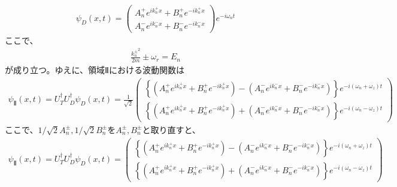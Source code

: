 \begin{align}
{\psi}_{D}(x,t) =
\begin{pmatrix}
A_{n}^{+}e^{ik_{n}^{+}x}+B_{n}^{+}e^{-ik_{n}^{+}x}  \\
A_{n}^{-}e^{ik_{n}^{-}x}+B_{n}^{-}e^{-ik_{n}^{-}x}
\end{pmatrix}
e^{-i\omega_{n}t}
\end{align}
ここで、
\begin{align}
\frac{{k_{n}^{\pm}}^2}{2m}{\pm}\omega_{r}=E_{n}
\end{align}
が成り立つ。ゆえに、領域Ⅱにおける波動関数は
\begin{align}
{\psi}_{Ⅱ}(x,t)=U_{T}^{\dagger}U_{D}^{\dagger}{\psi}_{D}(x,t)=\frac{1}{\sqrt{2}}
\begin{pmatrix}
\left\{(A_{n}^{+}e^{ik_{n}^{+}x}+B_{n}^{+}e^{-ik_{n}^{+}x})-(A_{n}^{-}e^{ik_{n}^{-}x}+B_{n}^{-}e^{-ik_{n}^{-}x})\right\}e^{-i(\omega_{n}+\omega_{z})t} \\
\left\{(A_{n}^{+}e^{ik_{n}^{+}x}+B_{n}^{+}e^{-ik_{n}^{+}x})+(A_{n}^{-}e^{ik_{n}^{-}x}+B_{n}^{-}e^{-ik_{n}^{-}x})\right\}e^{-i(\omega_{n}-\omega_{z})t}
\end{pmatrix}
\end{align}
ここで、$1/{\sqrt{2}}A_{n}^{\pm}, 1/{\sqrt{2}}B_{n}^{\pm}$を$A_{n}^{\pm}, B_{n}^{\pm}$と取り直すと、
\begin{align}
{\psi}_{Ⅱ}(x,t)=U_{T}^{\dagger}U_{D}^{\dagger}{\psi}_{D}(x,t)=
\begin{pmatrix}
\left\{(A_{n}^{+}e^{ik_{n}^{+}x}+B_{n}^{+}e^{-ik_{n}^{+}x})-(A_{n}^{-}e^{ik_{n}^{-}x}+B_{n}^{-}e^{-ik_{n}^{-}x})\right\}e^{-i(\omega_{n}+\omega_{z})t} \\
\left\{(A_{n}^{+}e^{ik_{n}^{+}x}+B_{n}^{+}e^{-ik_{n}^{+}x})+(A_{n}^{-}e^{ik_{n}^{-}x}+B_{n}^{-}e^{-ik_{n}^{-}x})\right\}e^{-i(\omega_{n}-\omega_{z})t}
\end{pmatrix}
\end{align}
